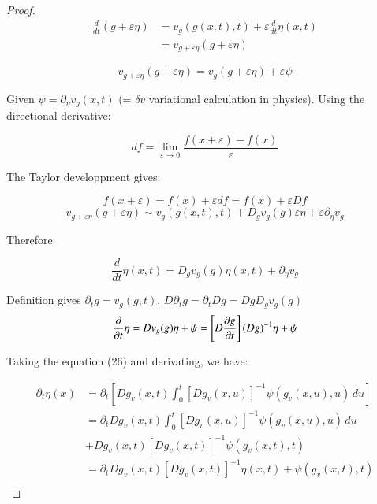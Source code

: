 \documentclass[final, paper=letter,5p,times,twocolumn]{elsarticle}
\theoremstyle{definition}
\begin{document}
\begin{proof}
  \begin{equation*}
    \begin{split}
      \frac{d}{dt} (g+\varepsilon \eta) & =  v_{g}(g(x,t),t) + \varepsilon \frac{d}{dt} \eta(x,t) \\
      & = v_{g+\varepsilon \eta}(g+\varepsilon \eta)
    \end{split}
  \end{equation*}

  $$
  v_{g+\varepsilon \eta}(g+\varepsilon \eta) = v_{g}(g+\varepsilon \eta) + \varepsilon \psi
  $$

  Given $\psi = \partial_{\eta} v_{g} (x,t)$ (= $\delta v$ variational calculation in physics). Using the directional derivative:

  $$
  df = \underset{\varepsilon \rightarrow 0}{\lim} \frac{f(x + \varepsilon) - f(x)}{\varepsilon}
  $$

  The Taylor developpment gives:

  $$
  f(x + \varepsilon) = f(x) + \varepsilon df = f(x) + \varepsilon Df
  $$
  $$
  v_{g+\varepsilon \eta}(g+\varepsilon \eta) \sim v_{g}(g(x,t),t) + D_{g} v_{g}(g) \varepsilon \eta + \varepsilon \partial_{\eta} v_{g}
  $$
  
Therefore 

  $$
  \frac{d}{dt} \eta(x,t) = D_{g}v_{g}(g) \eta(x,t) + \partial_{\eta} v_{g}
  $$


  Definition gives $\partial_{t} g = v_{g}(g,t)$. $D \partial_{t} g = \partial_{t} Dg = Dg D_{g}v_{g}(g)$
  $$
  \frac{\partial}{\partial t} \eta = D v_{g} (g) \eta + \psi\\
  = \left[ D \frac{\partial g}{\partial t} \right](Dg)^{-1} \eta + \psi
  $$

  Taking the equation (26) and derivating, we have:

  \begin{equation*}
    \begin{split}
    \partial_{t} \eta(x) & = \partial_{t} \left[ D g_{v}(x,t) \int_{0}^{t} \left[ Dg_{v}(x,u) \right]^{-1} \psi(g_{v}(x,u), u) \, du \right]\\
    & = \partial_{t}D g_{v}(x,t) \int_{0}^{t} \left[ Dg_{v}(x,u) \right]^{-1} \psi(g_{v}(x,u), u) \, du  \\
    & + D g_{v}(x,t) \left[ Dg_{v}(x,t) \right]^{-1} \psi(g_{v}(x,t), t) \\
    & = \partial_{t}D g_{v}(x,t) \left[ Dg_{v}(x,t) \right]^{-1} \eta(x,t) + \psi(g_{v}(x,t), t) \\
    \end{split}
  \end{equation*}

   
\end{proof}
\end{document}
